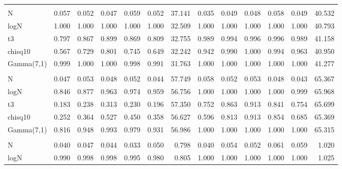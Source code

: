 \begin{table}[!h]
{\begin{tabular}[t]{lrrrrrrrrrrrr}
\addlinespace[0.3em]
\multicolumn{13}{l}{\textbf{Bootstrap Lobato}}\\
\hspace{1em}N & 0.057 & 0.052 & 0.047 & 0.059 & 0.052 & 37.141 & 0.035 & 0.049 & 0.048 & 0.058 & 0.049 & 40.532\\
\hspace{1em}logN & 1.000 & 1.000 & 1.000 & 1.000 & 1.000 & 32.509 & 1.000 & 1.000 & 1.000 & 1.000 & 1.000 & 40.793\\
\hspace{1em}t3 & 0.797 & 0.867 & 0.899 & 0.869 & 0.809 & 32.755 & 0.989 & 0.994 & 0.996 & 0.996 & 0.989 & 41.158\\
\hspace{1em}chisq10 & 0.567 & 0.729 & 0.801 & 0.745 & 0.649 & 32.242 & 0.942 & 0.990 & 1.000 & 0.994 & 0.963 & 40.950\\
\hspace{1em}Gamma(7,1) & 0.999 & 1.000 & 1.000 & 0.998 & 0.991 & 31.763 & 1.000 & 1.000 & 1.000 & 1.000 & 1.000 & 41.277\\
\addlinespace[0.3em]
\multicolumn{13}{l}{\textbf{Bootstrap Epps}}\\
\hspace{1em}N & 0.047 & 0.053 & 0.048 & 0.052 & 0.044 & 57.749 & 0.058 & 0.052 & 0.053 & 0.048 & 0.043 & 65.367\\
\hspace{1em}logN & 0.846 & 0.877 & 0.963 & 0.974 & 0.959 & 56.756 & 1.000 & 1.000 & 1.000 & 1.000 & 0.999 & 65.968\\
\hspace{1em}t3 & 0.183 & 0.238 & 0.313 & 0.230 & 0.196 & 57.350 & 0.752 & 0.863 & 0.913 & 0.841 & 0.754 & 65.699\\
\hspace{1em}chisq10 & 0.252 & 0.364 & 0.527 & 0.450 & 0.358 & 56.627 & 0.596 & 0.813 & 0.913 & 0.854 & 0.685 & 65.369\\
\hspace{1em}Gamma(7,1) & 0.816 & 0.948 & 0.993 & 0.979 & 0.931 & 56.986 & 1.000 & 1.000 & 1.000 & 1.000 & 1.000 & 65.315\\
\addlinespace[0.3em]
\multicolumn{13}{l}{\textbf{El Bouch}}\\
\hspace{1em}N & 0.040 & 0.047 & 0.044 & 0.033 & 0.050 & 0.798 & 0.040 & 0.054 & 0.052 & 0.061 & 0.059 & 1.020\\
\hspace{1em}logN & 0.990 & 0.998 & 0.998 & 0.995 & 0.980 & 0.805 & 1.000 & 1.000 & 1.000 & 1.000 & 1.000 & 1.025\\

\end{tabular}}
\end{table}
